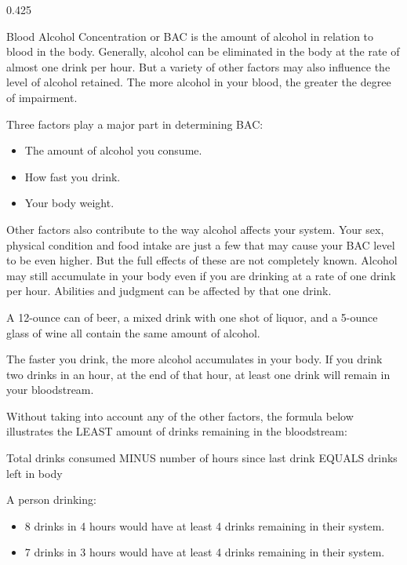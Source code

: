 \begin{langblock}{0.425}
	\begin{eng}
	
	Blood Alcohol Concentration or BAC is the amount of alcohol in relation to blood in the body.  Generally, alcohol can be eliminated in the body at the rate of almost one drink per hour. But a variety of other factors may also influence the level of alcohol retained. The more alcohol in your blood, the greater the degree of impairment.
	
	Three factors play a major part in determining BAC:
	
	
	\begin{itemize}[noitemsep]
		\item The amount of alcohol you consume.
		\item How fast you drink.
		\item Your body weight.
	\end{itemize}
	
	Other factors also contribute to the way alcohol affects your system. Your sex, physical condition and food intake are just a few that may cause your BAC level to be even higher. But the full effects of these are not completely known. Alcohol may still accumulate in your body even if you are drinking at a rate of one drink per hour. Abilities and judgment can be affected by that one drink.
	
	A 12-ounce can of beer, a mixed drink with one shot of liquor, and a 5-ounce glass of wine all contain the same amount of alcohol.
	
	The faster you drink, the more alcohol accumulates in your body. If you drink two drinks in an hour, at the end of that hour, at least one drink will remain in your bloodstream.
	
	Without taking into account any of the other factors, the formula below illustrates the LEAST amount of drinks remaining in the bloodstream:
	
	Total drinks consumed MINUS number of hours since last drink EQUALS drinks left in body
	
	
	
	A person drinking:
	\begin{itemize}[noitemsep]
		\item 8 drinks in 4 hours would have at least 4 drinks remaining in their system.
		\item 7 drinks in 3 hours would have at least 4 drinks remaining in their system.
	\end{itemize}
	

\end{eng}
\end{langblock}
